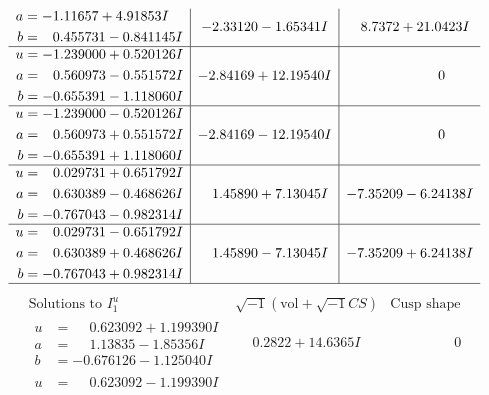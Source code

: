 \documentclass[1p]{elsarticle_modified}
\theoremstyle{definition}
\newcommand{\I}{\sqrt{-1}}
\begin{document}
$$\begin{array}{c|c|c}
\begin{aligned}
a &= -1.11657 + 4.91853 I \\
b &= \phantom{-}0.455731 - 0.841145 I\end{aligned}
 & -2.33120 - 1.65341 I & \phantom{-}8.7372 + 21.0423 I \\ \hline\begin{aligned}
u &= -1.239000 + 0.520126 I \\
a &= \phantom{-}0.560973 - 0.551572 I \\
b &= -0.655391 - 1.118060 I\end{aligned}
 & -2.84169 + 12.19540 I & \phantom{-0.000000 } 0 \\ \hline\begin{aligned}
u &= -1.239000 - 0.520126 I \\
a &= \phantom{-}0.560973 + 0.551572 I \\
b &= -0.655391 + 1.118060 I\end{aligned}
 & -2.84169 - 12.19540 I & \phantom{-0.000000 } 0 \\ \hline\begin{aligned}
u &= \phantom{-}0.029731 + 0.651792 I \\
a &= \phantom{-}0.630389 - 0.468626 I \\
b &= -0.767043 - 0.982314 I\end{aligned}
 & \phantom{-}1.45890 + 7.13045 I & -7.35209 - 6.24138 I \\ \hline\begin{aligned}
u &= \phantom{-}0.029731 - 0.651792 I \\
a &= \phantom{-}0.630389 + 0.468626 I \\
b &= -0.767043 + 0.982314 I\end{aligned}
 & \phantom{-}1.45890 - 7.13045 I & -7.35209 + 6.24138 I\\
 \hline 
 \end{array}$$\newpage$$\begin{array}{c|c|c}  
\text{Solutions to }I^u_{1}& \I (\text{vol} + \sqrt{-1}CS) & \text{Cusp shape}\\
 \hline 
\begin{aligned}
u &= \phantom{-}0.623092 + 1.199390 I \\
a &= \phantom{-}1.13835 - 1.85356 I \\
b &= -0.676126 - 1.125040 I\end{aligned}
 & \phantom{-}0.2822 + 14.6365 I & \phantom{-0.000000 } 0 \\ \hline\begin{aligned}
u &= \phantom{-}0.623092 - 1.199390 I \\

\end{aligned}
\end{array}$$
\end{document}
